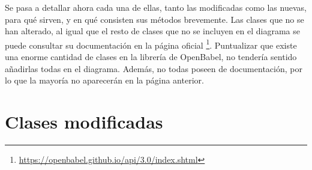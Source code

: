 % 


Se pasa a detallar ahora cada una de ellas, tanto las modificadas como las nuevas, para qué sirven, y en qué consisten sus métodos brevemente. Las clases que no se han alterado, al igual que el resto de clases que no se incluyen en el diagrama se puede consultar su documentación en la página oficial \footnote{\url{https://openbabel.github.io/api/3.0/index.shtml}}. Puntualizar que existe una enorme cantidad de clases en la librería de OpenBabel, no tendería sentido añadirlas todas en el diagrama. Además, no todas poseen de documentación, por lo que la mayoría no aparecerán en la página anterior.

\section{Clases modificadas}

